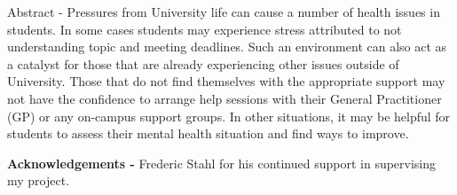 \noindent
\begin{itshape}
    Abstract - Pressures from University life can cause a number of health issues in students.
    In some cases students may experience stress attributed to not understanding topic and meeting deadlines.
    Such an environment can also act as a catalyst for those that are already experiencing other issues outside of University.
    Those that do not find themselves with the appropriate support may not have the confidence to arrange help sessions with their
    General Practitioner (GP) or any on-campus support groups. 
    In other situations, it may be helpful for students to assess their mental health situation and find ways to improve.
\end{itshape}

\vspace{0.5cm}
\noindent
\textbf{Acknowledgements - } Frederic Stahl for his continued support in supervising my project.
